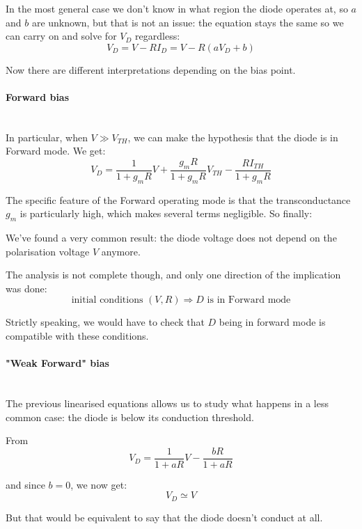\documentclass[10pt]{article}
\begin{document}
In the most general case we don't know in what region the diode operates at, so $a$ and $b$ are unknown, but that is not an issue: the equation stays the same so we can carry on and solve for $V_D$ regardless:
$$
	V_D = V - RI_D = V - R \left( aV_D + b \right)
$$


\centerline{}

Now there are different interpretations depending on the bias point.  

\paragraph{Forward bias}\mbox{}\\

In particular, when $V \gg V_{TH}$, we can make the hypothesis that the diode is in Forward mode. We get:
$$
	V_D = \dfrac{1}{1 + g_mR}V + \dfrac{g_mR}{1 + g_mR}V_{TH} - \dfrac{RI_{TH}}{1 + g_mR}
$$

The specific feature of the Forward operating mode is that the transconductance $g_m$ is particularly high, which makes several terms negligible. So finally:

\centerline{}

We've found a very common result: the diode voltage does not depend on the polarisation voltage $V$ anymore.

The analysis is not complete though, and only one direction of the implication was done:
$$
	 \text{initial conditions } (V, R) \Rightarrow D \text{ is in Forward mode}
$$

Strictly speaking, we would have to check that $D$ being in forward mode is compatible with these conditions.


\paragraph{"Weak Forward" bias}\mbox{}\\

The previous linearised equations allows us to study what happens in a less common case: the diode is below its conduction threshold.

From
$$
	V_D = \dfrac{1}{1 + aR}V - \dfrac{bR}{1 + aR}
$$

and since $b = 0$, we now get:
$$
	V_D \simeq V
$$

But that would be equivalent to say that the diode doesn't conduct at all.
\end{document}
